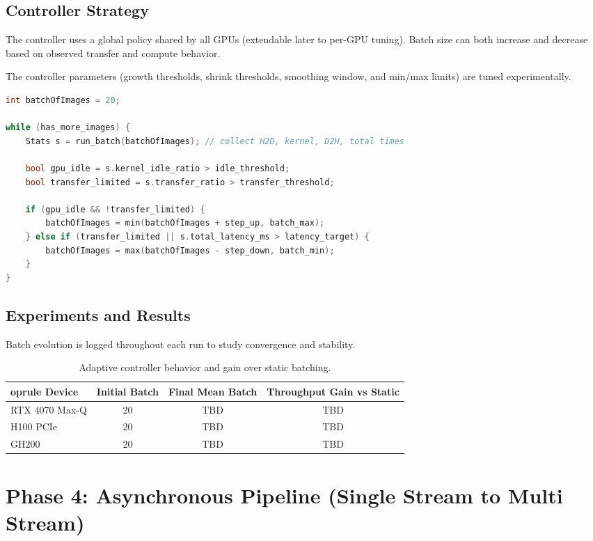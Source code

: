 \subsection{Controller Strategy}
The controller uses a global policy shared by all GPUs (extendable later to per-GPU tuning). Batch size can both increase and decrease based on observed transfer and compute behavior.

The controller parameters (growth thresholds, shrink thresholds, smoothing window, and min/max limits) are tuned experimentally.

\begin{lstlisting}[language=C++, caption={Adaptive batch-size controller (high-level logic)}]
int batchOfImages = 20;

while (has_more_images) {
    Stats s = run_batch(batchOfImages); // collect H2D, kernel, D2H, total times

    bool gpu_idle = s.kernel_idle_ratio > idle_threshold;
    bool transfer_limited = s.transfer_ratio > transfer_threshold;

    if (gpu_idle && !transfer_limited) {
        batchOfImages = min(batchOfImages + step_up, batch_max);
    } else if (transfer_limited || s.total_latency_ms > latency_target) {
        batchOfImages = max(batchOfImages - step_down, batch_min);
    }
}
\end{lstlisting}

\subsection{Experiments and Results}
Batch evolution is logged throughout each run to study convergence and stability.

\begin{table}[H]
\centering
\begin{tabular}{lccc}
	oprule
Device & Initial Batch & Final Mean Batch & Throughput Gain vs Static \\
\midrule
RTX 4070 Max-Q & 20 & TBD & TBD \\
H100 PCIe & 20 & TBD & TBD \\
GH200 & 20 & TBD & TBD \\
\bottomrule
\end{tabular}
\caption{Adaptive controller behavior and gain over static batching.}
\end{table}


\section{Phase 4: Asynchronous Pipeline (Single Stream to Multi Stream)}


